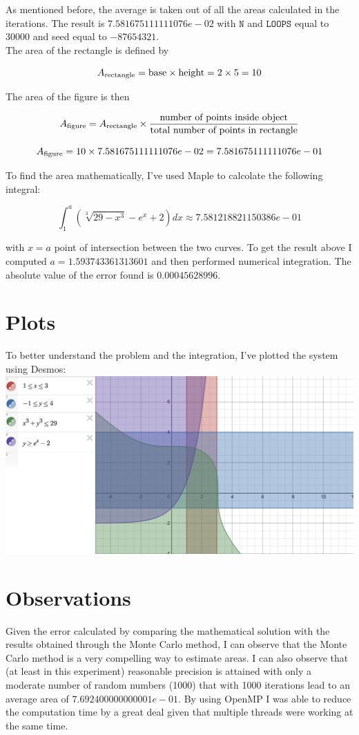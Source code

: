 \documentclass{article}
\newcommand{\code}{\texttt}
\begin{document}
As mentioned before, the average is taken out of all the areas calculated in the iterations. The result is $7.581675111111076e-02$ with $\code{N}$ and $\code{LOOPS}$ equal to 30000 and seed equal to $-87654321$.\\

The area of the rectangle is defined by 

$$A_{\textnormal{rectangle}}= \textnormal{base}\times \textnormal{height}=2\times5=10$$

The area of the figure is then

$$A_{\textnormal{figure}}=A_{\textnormal{rectangle}}\times \frac{\textnormal{number of points inside object}}{\textnormal{total number of points in rectangle}}$$

$$A_{\textnormal{figure}}=10\times 7.581675111111076e-02=7.581675111111076e-01$$

To find the area mathematically, I've used Maple to calcolate the following integral:

$$
\int_1^{a} (\sqrt[3]{29-x^3}-e^x+2)dx\approx 7.581218821150386e-01
$$

with $x=a$ point of intersection between the two curves. To get the result above I computed $a=1.593743361313601$ and then performed numerical integration. The absolute value of the error found is $0.00045628996$.

\section{Plots}
To better understand the problem and the integration, I've plotted the system using Desmos:\\

\includegraphics[width=\textwidth,height=\textheight,keepaspectratio]{desmos.png}
\section{Observations}
Given the error calculated by comparing the mathematical solution with the results obtained through the Monte Carlo method, I can observe that the Monte Carlo method is a very compelling way to estimate areas. I can also observe that (at least in this experiment) reasonable precision is attained with only a moderate number of random numbers (1000) that with 1000 iterations lead to an average area of $7.692400000000001e-01$. By using OpenMP I was able to reduce the computation time by a great deal given that multiple threads were working at the same time.
\end{document}
